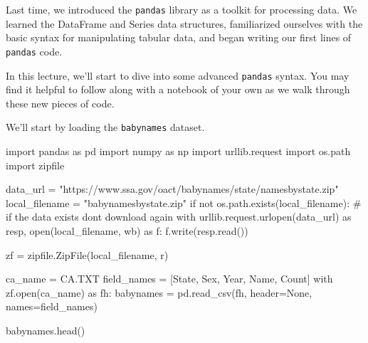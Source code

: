 \documentclass[
  letterpaper,
  DIV=11,
  numbers=noendperiod]{scrreprt}
\newenvironment{Shaded}{\begin{snugshade}}{\end{snugshade}}
\newcommand{\BuiltInTok}[1]{\textcolor[rgb]{0.00,0.23,0.31}{#1}}
\newcommand{\CommentTok}[1]{\textcolor[rgb]{0.37,0.37,0.37}{#1}}
\newcommand{\ControlFlowTok}[1]{\textcolor[rgb]{0.00,0.23,0.31}{#1}}
\newcommand{\ImportTok}[1]{\textcolor[rgb]{0.00,0.46,0.62}{#1}}
\newcommand{\KeywordTok}[1]{\textcolor[rgb]{0.00,0.23,0.31}{#1}}
\newcommand{\NormalTok}[1]{\textcolor[rgb]{0.00,0.23,0.31}{#1}}
\newcommand{\OperatorTok}[1]{\textcolor[rgb]{0.37,0.37,0.37}{#1}}
\newcommand{\StringTok}[1]{\textcolor[rgb]{0.13,0.47,0.30}{#1}}
\newcommand{\VariableTok}[1]{\textcolor[rgb]{0.07,0.07,0.07}{#1}}
\begin{document}
Last time, we introduced the \texttt{pandas} library as a toolkit for
processing data. We learned the DataFrame and Series data structures,
familiarized ourselves with the basic syntax for manipulating tabular
data, and began writing our first lines of \texttt{pandas} code.

In this lecture, we'll start to dive into some advanced \texttt{pandas}
syntax. You may find it helpful to follow along with a notebook of your
own as we walk through these new pieces of code.

We'll start by loading the \texttt{babynames} dataset.

\begin{Shaded}
\begin{Highlighting}[]
\ImportTok{import}\NormalTok{ pandas }\ImportTok{as}\NormalTok{ pd}
\ImportTok{import}\NormalTok{ numpy }\ImportTok{as}\NormalTok{ np}
\ImportTok{import}\NormalTok{ urllib.request}
\ImportTok{import}\NormalTok{ os.path}
\ImportTok{import}\NormalTok{ zipfile}

\NormalTok{data\_url }\OperatorTok{=} \StringTok{"https://www.ssa.gov/oact/babynames/state/namesbystate.zip"}
\NormalTok{local\_filename }\OperatorTok{=} \StringTok{"babynamesbystate.zip"}
\ControlFlowTok{if} \KeywordTok{not}\NormalTok{ os.path.exists(local\_filename): }\CommentTok{\# if the data exists don\textquotesingle{}t download again}
    \ControlFlowTok{with}\NormalTok{ urllib.request.urlopen(data\_url) }\ImportTok{as}\NormalTok{ resp, }\BuiltInTok{open}\NormalTok{(local\_filename, }\StringTok{\textquotesingle{}wb\textquotesingle{}}\NormalTok{) }\ImportTok{as}\NormalTok{ f:}
\NormalTok{        f.write(resp.read())}

\NormalTok{zf }\OperatorTok{=}\NormalTok{ zipfile.ZipFile(local\_filename, }\StringTok{\textquotesingle{}r\textquotesingle{}}\NormalTok{)}

\NormalTok{ca\_name }\OperatorTok{=} \StringTok{\textquotesingle{}CA.TXT\textquotesingle{}}
\NormalTok{field\_names }\OperatorTok{=}\NormalTok{ [}\StringTok{\textquotesingle{}State\textquotesingle{}}\NormalTok{, }\StringTok{\textquotesingle{}Sex\textquotesingle{}}\NormalTok{, }\StringTok{\textquotesingle{}Year\textquotesingle{}}\NormalTok{, }\StringTok{\textquotesingle{}Name\textquotesingle{}}\NormalTok{, }\StringTok{\textquotesingle{}Count\textquotesingle{}}\NormalTok{]}
\ControlFlowTok{with}\NormalTok{ zf.}\BuiltInTok{open}\NormalTok{(ca\_name) }\ImportTok{as}\NormalTok{ fh:}
\NormalTok{    babynames }\OperatorTok{=}\NormalTok{ pd.read\_csv(fh, header}\OperatorTok{=}\VariableTok{None}\NormalTok{, names}\OperatorTok{=}\NormalTok{field\_names)}

\NormalTok{babynames.head()}
\end{Highlighting}
\end{Shaded}
\end{document}
